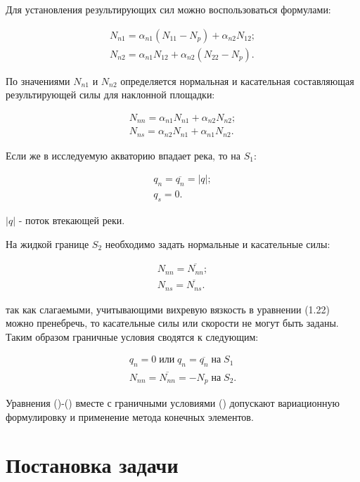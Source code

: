 \documentclass[14pt]{extreport}
\begin{document}
Для установления результирующих сил можно воспользоваться формулами:

\begin{eqnarray}
N_{n1}=\alpha_{n1}(N_{11}-N_{p})+\alpha_{n2}N_{12}; \nonumber\\
N_{n2}=\alpha_{n1}N_{12}+\alpha_{n2}(N_{22}-N_{p}).
\end{eqnarray}

По значениями $N_{n1}$ и $N_{n2}$ определяется нормальная и касательная составляющая результирующей силы для наклонной площадки:

\begin{eqnarray}
N_{nn}=\alpha_{n1}N_{n1}+\alpha_{n2}N_{n2}; \nonumber\\
N_{ns}=\alpha_{n2}N_{n1}+\alpha_{n1}N_{n2}.
\end{eqnarray}

Если же в исследуемую акваторию впадает река, то на $ S_1 $:

\begin{eqnarray}
q_n=\overline{q_n}=|q|; \nonumber\\
q_s=0.
\end{eqnarray}

 $|q|$ - поток втекающей
реки. 

На жидкой границе $ S_2 $ необходимо задать нормальные и касательные силы:

\begin{eqnarray}
N_{nn}=\overline{N_{nn}}; \nonumber\\
N_{ns}=\overline{N_{ns}}.
\end{eqnarray}

 так как слагаемыми, учитывающими вихревую вязкость в уравнении (1.22) можно пренебречь, то касательные силы или скорости не могут быть заданы. Таким образом граничные условия сводятся к следующим:

\begin{eqnarray}
q_n=0 \; \text{или} \; q_n=\overline{q_n} \; \text{на} \; S_1\nonumber\\
N_{nn}=\overline{N_{nn}}=-N_p \; \text{на} \; S_2.
\end{eqnarray}


Уравнения ()-() вместе с граничными условиями () допускают вариационную формулировку и применение метода конечных элементов.

\chapter{Постановка задачи}
\end{document}

